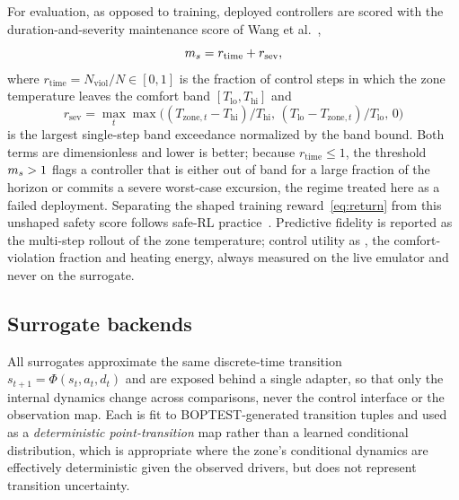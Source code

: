 For evaluation, as opposed to training, deployed controllers are scored with the
duration-and-severity maintenance score of Wang et al.~\cite{Wang2025SafeDRL},
\begin{equation}
m_s = r_{\mathrm{time}} + r_{\mathrm{sev}},
\label{eq:ms}
\end{equation}
where $r_{\mathrm{time}}=N_{\mathrm{viol}}/N\in[0,1]$ is the fraction of control steps in which the
zone temperature leaves the comfort band $[T_{\mathrm{lo}},T_{\mathrm{hi}}]$ and
\begin{equation*}
r_{\mathrm{sev}}=\max_t\max\!\big((T_{\mathrm{zone},t}-T_{\mathrm{hi}})/T_{\mathrm{hi}},\,
(T_{\mathrm{lo}}-T_{\mathrm{zone},t})/T_{\mathrm{lo}},\,0\big)
\end{equation*}
is the largest single-step band exceedance normalized by the band bound. Both terms are
dimensionless and lower is better; because $r_{\mathrm{time}}\le 1$, the threshold $m_s>1$ flags a
controller that is either out of band for a large fraction of the horizon or commits a severe
worst-case excursion, the regime treated here as a failed deployment. Separating the shaped training
reward~\eqref{eq:return} from this unshaped safety score follows safe-RL
practice~\cite{Garcia2015SafeRL}. Predictive fidelity is reported as the multi-step rollout \RMSE{}
of the zone temperature; control utility as \ms{}, the comfort-violation fraction and heating
energy, always measured on the live emulator and never on the surrogate.

\subsection{Surrogate backends}\label{ssec:surrogates}
All surrogates approximate the same discrete-time transition $s_{t+1}=\Phi(s_t,a_t,d_t)$ and are
exposed behind a single adapter, so that only the internal dynamics change across comparisons, never
the control interface or the observation map. Each is fit to BOPTEST-generated transition tuples and
used as a \emph{deterministic point-transition} map rather than a learned conditional distribution,
which is appropriate where the zone's conditional dynamics are effectively deterministic given the
observed drivers, but does not represent transition uncertainty.

